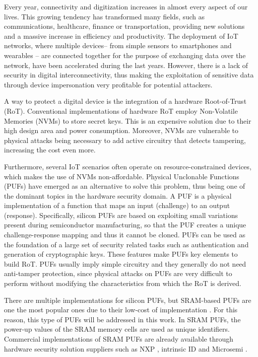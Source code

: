 
Every year, connectivity and digitization increases in almost every aspect of our lives. This growing tendency has transformed many fields, such as communications, healthcare, finance or transportation, providing new solutions and a massive increase in efficiency and productivity. The deployment of IoT networks, where multiple devices– from simple sensors to smartphones and wearables – are connected together for the purpose of exchanging data over the network, have been accelerated during the last years. However, there is a lack of security in digital interconnectivity, thus making the exploitation of sensitive data through device impersonation very profitable for potential attackers. 

A way to protect a digital device is the integration of a hardware Root-of-Trust (RoT). Conventional implementations of hardware RoT employ Non-Volatile Memories (NVMs) to store secret keys. This is an expensive solution due to their high design area and power consumption. Moreover, NVMs are vulnerable to physical attacks being necessary to add active circuitry that detects tampering, increasing the cost even more. 

Furthermore, several IoT scenarios often operate on resource-constrained devices, which makes the use of NVMs non-affordable. Physical Unclonable Functions (PUFs) have emerged as an alternative to solve this problem, thus being one of the dominant topics in the hardware security domain. A PUF is a physical implementation of a function that maps an input (challenge) to an output (response). Specifically, silicon PUFs are based on exploiting small variations present during semiconductor manufacturing, so that the PUF creates a unique challenge-response mapping and thus it cannot be cloned. PUFs can be used as the foundation of a large set of security related tasks such as authentication and generation of cryptographic keys. These features make PUFs key elements to build RoT. PUFs usually imply simple circuitry and they generally do not need anti-tamper protection, since physical attacks on PUFs are very difficult to perform without modifying the characteristics from which the RoT is derived. 

There are multiple implementations for silicon PUFs, but SRAM-based PUFs are one the most popular ones due to their low-cost of implementation \cite{McGrath2019,Bohm2013}. For this reason, this type of PUFs will be addressed in this work. In SRAM PUFs, the power-up values of the SRAM memory cells are used as unique identifiers. Commercial implementations of SRAM PUFs are already available through hardware security solution suppliers such as NXP \cite{NXP}, intrinsic ID \cite{Intrinsic} and Microsemi \cite{Microsemi}.

